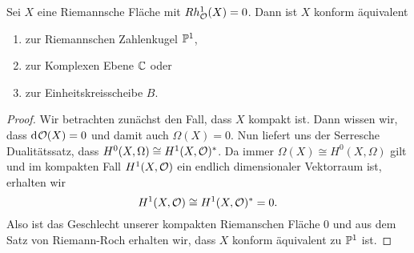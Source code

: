 \begin{thm}
  \label{thm:rmt}
  Sei $X$ eine Riemannsche Fläche mit $Rh_\hol^1(X) = 0$. Dann ist $X$
  konform äquivalent
  \begin{enumerate}
  \item zur Riemannschen Zahlenkugel $\P^1$,
  \item zur Komplexen Ebene $\C$ oder
  \item zur Einheitskreisscheibe $B$.
  \end{enumerate}
\end{thm}

\begin{proof}
  Wir betrachten zunächst den Fall,
  dass $X$ kompakt ist. Dann wissen wir, dass $\d
  \hol(X) = 0$ und damit auch $\Omega(X) = 0$. Nun liefert uns der
  Serresche Dualitätssatz, dass $H^0(X, \Omega) \cong H^1(X,
  \hol)^\ast$. Da immer $\Omega(X) \cong H^0(X, \Omega)$ gilt
  und im kompakten Fall $H^1(X, \hol)$ ein endlich dimensionaler
  Vektorraum ist, erhalten wir
  \[
  H^1(X, \hol) \cong H^1(X, \hol)^\ast = 0.
  \]
  Also ist das Geschlecht unserer kompakten Riemanschen Fläche 0 und
  aus dem Satz von Riemann-Roch erhalten wir, dass $X$ konform
  äquivalent zu $\P^1$ ist.


\end{proof}
